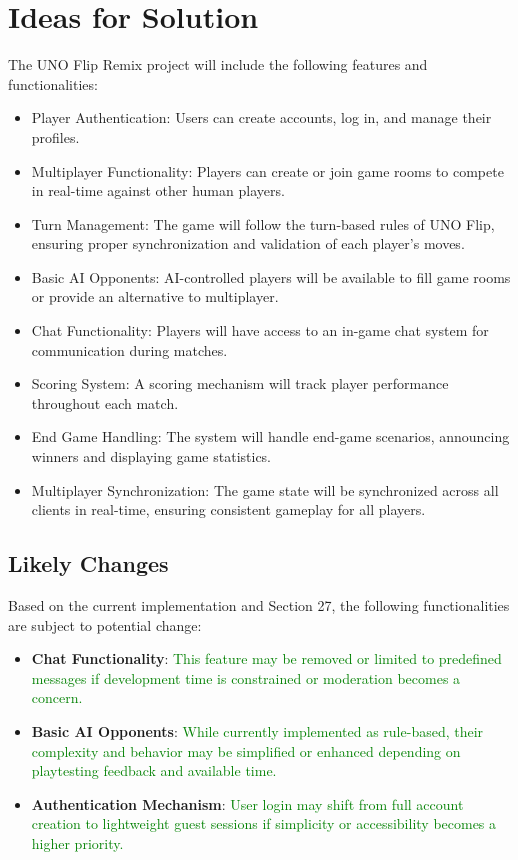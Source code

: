 \documentclass[12pt]{article}
\newcommand{\added}[1]{\textcolor{green}{#1}}
\begin{document}
\section{Ideas for Solution}
The UNO Flip Remix project will include the following features and functionalities:
\begin{itemize}
    \item Player Authentication: Users can create accounts, log in, and manage their profiles.
    \item Multiplayer Functionality: Players can create or join game rooms to compete in real-time against other human players.
    \item Turn Management: The game will follow the turn-based rules of UNO Flip, ensuring proper synchronization and validation of each player's moves.
    \item Basic AI Opponents: AI-controlled players will be available to fill game rooms or provide an alternative to multiplayer.
    \item Chat Functionality: Players will have access to an in-game chat system for communication during matches.
    \item Scoring System: A scoring mechanism will track player performance throughout each match.
    \item End Game Handling: The system will handle end-game scenarios, announcing winners and displaying game statistics.
    \item Multiplayer Synchronization: The game state will be synchronized across all clients in real-time, ensuring consistent gameplay for all players.
\end{itemize}

\subsection{Likely Changes}
Based on the current implementation and Section 27, the following functionalities are subject to potential change:
\begin{itemize}
    \item \textbf{Chat Functionality}: \added{This feature may be removed or limited to predefined messages if development time is constrained or moderation becomes a concern.}
    
    \item \textbf{Basic AI Opponents}: \added{While currently implemented as rule-based, their complexity and behavior may be simplified or enhanced depending on playtesting feedback and available time.}
    
    \item \textbf{Authentication Mechanism}: \added{User login may shift from full account creation to lightweight guest sessions if simplicity or accessibility becomes a higher priority.}
\end{itemize}
\end{document}
